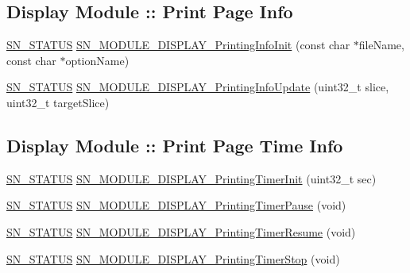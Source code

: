 \subsection*{Display Module \+:\+: Print Page Info}
\begin{DoxyCompactItemize}
\item 
\hyperlink{group__SYSTEM__ERROR_ga4540713b9a7a18ce44d78c3a10f7442f}{S\+N\+\_\+\+S\+T\+A\+T\+US} \hyperlink{group__MODULE__DISPLAY_ga6059a98606c93e2bd4bd2ffb68486e4c}{S\+N\+\_\+\+M\+O\+D\+U\+L\+E\+\_\+\+D\+I\+S\+P\+L\+A\+Y\+\_\+\+Printing\+Info\+Init} (const char $\ast$file\+Name, const char $\ast$option\+Name)
\item 
\hyperlink{group__SYSTEM__ERROR_ga4540713b9a7a18ce44d78c3a10f7442f}{S\+N\+\_\+\+S\+T\+A\+T\+US} \hyperlink{group__MODULE__DISPLAY_ga943b965a7a2e59a6c9f035c74c2c8735}{S\+N\+\_\+\+M\+O\+D\+U\+L\+E\+\_\+\+D\+I\+S\+P\+L\+A\+Y\+\_\+\+Printing\+Info\+Update} (uint32\+\_\+t slice, uint32\+\_\+t target\+Slice)
\end{DoxyCompactItemize}
\subsection*{Display Module \+:\+: Print Page Time Info}
\begin{DoxyCompactItemize}
\item 
\hyperlink{group__SYSTEM__ERROR_ga4540713b9a7a18ce44d78c3a10f7442f}{S\+N\+\_\+\+S\+T\+A\+T\+US} \hyperlink{group__MODULE__DISPLAY_gac630c6bd386295f3008bc04e8b9c92a0}{S\+N\+\_\+\+M\+O\+D\+U\+L\+E\+\_\+\+D\+I\+S\+P\+L\+A\+Y\+\_\+\+Printing\+Timer\+Init} (uint32\+\_\+t sec)
\item 
\hyperlink{group__SYSTEM__ERROR_ga4540713b9a7a18ce44d78c3a10f7442f}{S\+N\+\_\+\+S\+T\+A\+T\+US} \hyperlink{group__MODULE__DISPLAY_ga21d62aed53ed746d4912685df22c224a}{S\+N\+\_\+\+M\+O\+D\+U\+L\+E\+\_\+\+D\+I\+S\+P\+L\+A\+Y\+\_\+\+Printing\+Timer\+Pause} (void)
\item 
\hyperlink{group__SYSTEM__ERROR_ga4540713b9a7a18ce44d78c3a10f7442f}{S\+N\+\_\+\+S\+T\+A\+T\+US} \hyperlink{group__MODULE__DISPLAY_ga457dd831602b689bb557899b06e69e3c}{S\+N\+\_\+\+M\+O\+D\+U\+L\+E\+\_\+\+D\+I\+S\+P\+L\+A\+Y\+\_\+\+Printing\+Timer\+Resume} (void)
\item 
\hyperlink{group__SYSTEM__ERROR_ga4540713b9a7a18ce44d78c3a10f7442f}{S\+N\+\_\+\+S\+T\+A\+T\+US} \hyperlink{group__MODULE__DISPLAY_ga23a40fbba57f5da86b6173fe40861196}{S\+N\+\_\+\+M\+O\+D\+U\+L\+E\+\_\+\+D\+I\+S\+P\+L\+A\+Y\+\_\+\+Printing\+Timer\+Stop} (void)
\end{DoxyCompactItemize}


